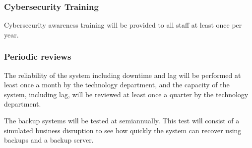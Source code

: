 \subsubsection{Cybersecurity Training}
Cybersecurity awareness training will be provided to all staff at
least once per year.

\subsubsection{Periodic reviews}

The reliability of the system including downtime and lag will be
performed at least once a month by the technology department, and the
capacity of the system, including lag, will be reviewed at least once a
quarter by the technology department.

The backup systems will be tested at semiannually.  This test will
consist of a simulated business disruption to see how quickly the
system can recover using backups and a backup server.

